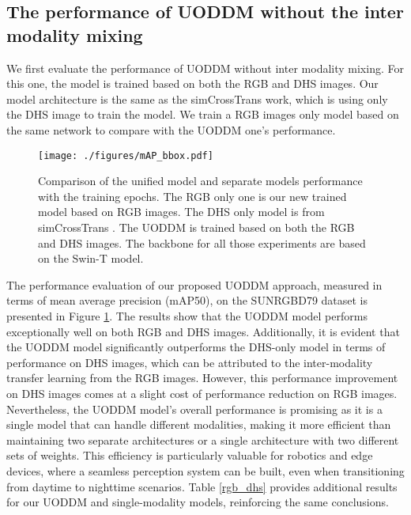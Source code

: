 \documentclass[]{modified_llncs}
\begin{document}
\subsection{The performance of UODDM without the inter modality mixing}
We first evaluate the performance of UODDM without inter modality mixing. For this one, the model is trained based on both the RGB and DHS images. Our model architecture is the same as  the simCrossTrans \cite{simCrossTrans_cite} work, which is using only the DHS image to train the model. We train a RGB images only model based on the same network to compare with the UODDM one's performance. 
\begin{figure}[H]
\begin{center}
\texttt{[image: ./figures/mAP\_bbox.pdf]}
\end{center}
    \caption{Comparison of the unified model and separate models performance with the training epochs. The RGB only one is our new trained model based on RGB images. The DHS only model is from simCrossTrans \cite{simCrossTrans_cite}. The UODDM is trained based on both the RGB and DHS images. The backbone for all those experiments are based on the Swin-T model.}
\label{fig:main_res}
\end{figure}
The performance evaluation of our proposed UODDM approach, measured in terms of mean average precision (mAP50), on the SUNRGBD79 dataset is presented in Figure \ref{fig:main_res}. The results show that the UODDM model performs exceptionally well on both RGB and DHS images. Additionally, it is evident that the UODDM model significantly outperforms the DHS-only model in terms of performance on DHS images, which can be attributed to the inter-modality transfer learning from the RGB images. However, this performance improvement on DHS images comes at a slight cost of performance reduction on RGB images. Nevertheless, the UODDM model's overall performance is promising as it is a single model that can handle different modalities, making it more efficient than maintaining two separate architectures or a single architecture with two different sets of weights. This efficiency is particularly valuable for robotics and edge devices, where a seamless perception system can be built, even when transitioning from daytime to nighttime scenarios. Table \ref{rgb_dhs} provides additional results for our UODDM and single-modality models, reinforcing the same conclusions.\\
\end{document}
